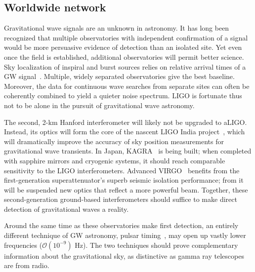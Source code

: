         \subsection{Worldwide network}
        \label{worldwide}
 
Gravitational wave signals are an unknown in astronomy.
It has long been recognized that multiple observatories with independent confirmation of a signal would be more persuasive evidence of detection than an isolated site.
Yet even once the field is established, additional observatories will permit better science.
Sky localization of inspiral and burst sources relies on relative arrival times of a GW signal~\cite{Saulson}.
Multiple, widely separated observatories give the best baseline.
Moreover, the data for continuous wave searches from separate sites can often be coherently combined to yield a quieter noise spectrum.
LIGO is fortunate thus not to be alone in the pursuit of gravitational wave astronomy.

The second, 2-km Hanford interferometer will likely not be upgraded to aLIGO.
Instead, its optics will form the core of the nascent LIGO India project~\cite{IyerIndia2011}, which will dramatically improve the accuracy of sky position measurements for gravitational wave transients.
In Japan, KAGRA~\cite{Kuroda2010} is being built; when completed with sapphire mirrors and cryogenic systems, it should reach comparable sensitivity to the LIGO interferometers.
Advanced VIRGO~\cite{Acernese2009} benefits from the first-generation superattenuator's superb seismic isolation performance; from it will be suspended new optics that reflect a more powerful beam.
Together, these second-generation ground-based interferometers should suffice to make direct detection of gravitational waves a reality.

Around the same time as these observatories make first detection, an entirely different technique of GW astronomy, pulsar timing~\cite{Hobbs2010}, may open up vastly lower frequencies ($\mathcal{O}(10^{-9})$ Hz).
The two techniques should prove complementary information about the gravitational sky, as distinctive as gamma ray telescopes are from radio.

